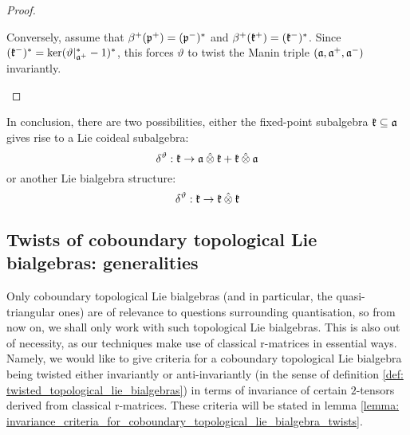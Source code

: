\begin{proof}
\begin{enumerate}
                    Conversely, assume that $\beta^+(\mathfrak{p}^+) = (\mathfrak{p}^-)^*$ and $\beta^+(\mathfrak{k}^+) = (\mathfrak{k}^-)^*$. Since $(\mathfrak{k}^-)^* = \ker(\vartheta|_{\mathfrak{a}^+}^* - 1)^*$, this forces $\vartheta$ to twist the Manin triple $(\mathfrak{a}, \mathfrak{a}^+, \mathfrak{a}^-)$ invariantly.
                \end{enumerate}
            \end{proof}
        
        
        In conclusion, there are two possibilities, either the fixed-point subalgebra $\mathfrak{k} \subseteq \mathfrak{a}$ gives rise to a Lie coideal subalgebra:
            $$\delta^{\vartheta}: \k \to \a \hattensor \k + \k \hattensor \a$$
        or another Lie bialgebra structure:
            $$\delta^{\vartheta}: \k \to \k \hattensor \k$$

    \subsection{Twists of coboundary topological Lie bialgebras: generalities} \label{subsection: twisted_coboundary_topological_lie_bialgebras_generalities}
        Only coboundary topological Lie bialgebras (and in particular, the quasi-triangular ones) are of relevance to questions surrounding quantisation, so from now on, we shall only work with such topological Lie bialgebras. This is also out of necessity, as our techniques make use of classical r-matrices in essential ways. Namely, we would like to give criteria for a coboundary topological Lie bialgebra being twisted either invariantly or anti-invariantly (in the sense of definition \ref{def: twisted_topological_lie_bialgebras}) in terms of invariance of certain $2$-tensors derived from classical r-matrices. These criteria will be stated in lemma \ref{lemma: invariance_criteria_for_coboundary_topological_lie_bialgebra_twists}.

